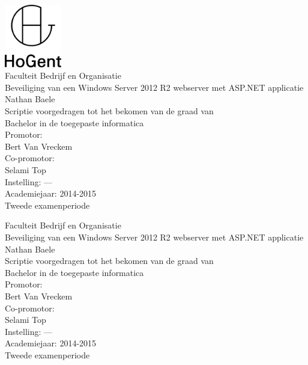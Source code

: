 \documentclass[pdftex,a4paper,12pt]{report}
\newcommand{\emptypage}{
\newpage
\thispagestyle{empty}
\mbox{}
\newpage
}
\newcommand{\student}{Nathan Baele}
\newcommand{\promotor}{Bert Van Vreckem}
\newcommand{\copromotor}{Selami Top}
\newcommand{\instelling}{---}
\newcommand{\titel}{Beveiliging van een Windows Server 2012 R2 webserver met ASP.NET applicatie}
\newcommand{\faculteit}{Faculteit Bedrijf en Organisatie}
\newcommand{\rapporttype}{Scriptie voorgedragen tot het bekomen van de graad van\\Bachelor in de toegepaste informatica}
\newcommand{\academiejaar}{2014-2015}
\newcommand{\examenperiode}{Tweede examenperiode}
\begin{document}

\begin{titlepage}
  \begin{center}

    \begingroup
    \rmfamily
    \includegraphics[width=2.5cm]{img/HG-beeldmerk-woordmerk}\\[.5cm]
    \faculteit\\[3cm]
    \titel
    \vfill
    \student\\[3.5cm]
    \rapporttype\\[2cm]
    Promotor:\\
    \promotor\\
    Co-promotor:\\
    \copromotor\\[2.5cm]
    Instelling: \instelling\\[.5cm]
    Academiejaar: \academiejaar\\[.5cm]
    \examenperiode
    \endgroup

  \end{center}
  \restoregeometry
\end{titlepage}


\emptypage


\begin{titlepage}
  \begin{center}

    \begingroup
    \rmfamily
    \faculteit\\[3cm]
    \titel
    \vfill
    \student\\[3.5cm]
    \rapporttype\\[2cm]
    Promotor:\\
    \promotor\\
    Co-promotor:\\
    \copromotor\\[2.5cm]
    Instelling: \instelling\\[.5cm]
    Academiejaar: \academiejaar\\[.5cm]
    \examenperiode
    \endgroup

  \end{center}
  \restoregeometry
\end{titlepage}
\end{document}

